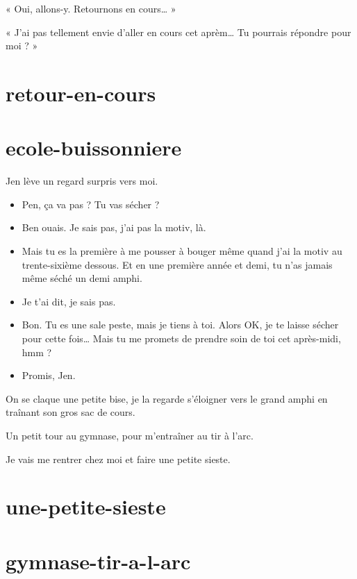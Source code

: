 \item « Oui, allons-y. Retournons en cours… » 
\item « J'ai pas tellement envie d'aller en cours cet aprèm… Tu pourrais répondre pour moi ? » 
\enw

\section{retour-en-cours}



\section{ecole-buissonniere}

Jen lève un regard surpris vers moi.

\begin{itemize}
\item Pen, ça va pas ? Tu vas sécher ?
\item Ben ouais. Je sais pas, j'ai pas la motiv, là.
\item Mais tu es la première à me pousser à bouger même quand j'ai la motiv au trente-sixième dessous. Et en une première année et demi, tu n'as jamais même séché un demi amphi.
\item Je t'ai dit, je sais pas.
\item Bon. Tu es une sale peste, mais je tiens à toi. Alors OK, je te laisse sécher pour cette fois… Mais tu me promets de prendre soin de toi cet après-midi, hmm ?
\item Promis, Jen.
\end{itemize}

On se claque une petite bise, je la regarde s'éloigner vers le grand amphi en traînant son gros sac de cours.

\item Un petit tour au gymnase, pour m'entraîner au tir à l'arc. 
\item Je vais me rentrer chez moi et faire une petite sieste. 

\section{une-petite-sieste}

\section{gymnase-tir-a-l-arc}

